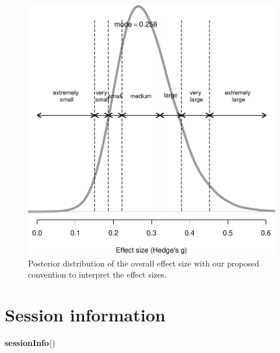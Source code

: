 \documentclass[floatsintext,doc]{apa6}
\newenvironment{Shaded}{\begin{snugshade}}{\end{snugshade}}
\newcommand{\KeywordTok}[1]{\textcolor[rgb]{0.13,0.29,0.53}{\textbf{#1}}}
\newcommand{\NormalTok}[1]{#1}
\begin{document}
\begin{figure}

{\centering \includegraphics[width=0.66\linewidth]{supplementary_materials_files/figure-latex/effsize-1} 

}

\caption{Posterior distribution of the overall effect size with our proposed convention to interpret the effect sizes.}\label{fig:effsize}
\end{figure}

\newpage

\hypertarget{session-information}{%
\section{Session information}\label{session-information}}

\begin{Shaded}
\begin{Highlighting}[]
\KeywordTok{sessionInfo}\NormalTok{()}
\end{Highlighting}
\end{Shaded}
\end{document}

